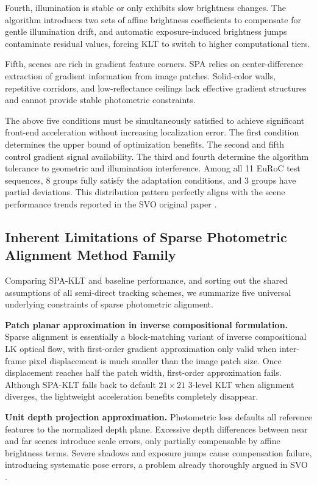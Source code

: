 \documentclass[journal,twoside,web]{ieeecolor}
\begin{document}
Fourth, illumination is stable or only exhibits slow brightness changes. The algorithm introduces two sets of affine brightness coefficients to compensate for gentle illumination drift, and automatic exposure-induced brightness jumps contaminate residual values, forcing KLT to switch to higher computational tiers.

Fifth, scenes are rich in gradient feature corners. SPA relies on center-difference extraction of gradient information from image patches. Solid-color walls, repetitive corridors, and low-reflectance ceilings lack effective gradient structures and cannot provide stable photometric constraints.

The above five conditions must be simultaneously satisfied to achieve significant front-end acceleration without increasing localization error. The first condition determines the upper bound of optimization benefits. The second and fifth control gradient signal availability. The third and fourth determine the algorithm tolerance to geometric and illumination interference. Among all 11 EuRoC test sequences, 8 groups fully satisfy the adaptation conditions, and 3 groups have partial deviations. This distribution pattern perfectly aligns with the scene performance trends reported in the SVO original paper \cite{forster2017svo}.

\subsection{Inherent Limitations of Sparse Photometric Alignment Method Family}

Comparing SPA-KLT and baseline performance, and sorting out the shared assumptions of all semi-direct tracking schemes, we summarize five universal underlying constraints of sparse photometric alignment.

\textbf{Patch planar approximation in inverse compositional formulation.} Sparse alignment is essentially a block-matching variant of inverse compositional LK optical flow, with first-order gradient approximation only valid when inter-frame pixel displacement is much smaller than the image patch size. Once displacement reaches half the patch width, first-order approximation fails. Although SPA-KLT falls back to default $21\times21$ 3-level KLT when alignment diverges, the lightweight acceleration benefits completely disappear.

\textbf{Unit depth projection approximation.} Photometric loss defaults all reference features to the normalized depth plane. Excessive depth differences between near and far scenes introduce scale errors, only partially compensable by affine brightness terms. Severe shadows and exposure jumps cause compensation failure, introducing systematic pose errors, a problem already thoroughly argued in SVO \cite{forster2017svo}.
\end{document}
